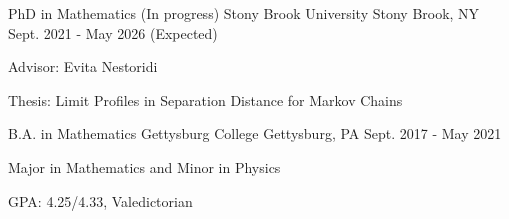 


\begin{cventries}

\cventry
{PhD in Mathematics (In progress)} %
{Stony Brook University} %
{Stony Brook, NY} %
{Sept. 2021 - May 2026 (Expected)} %
{ %
\begin{cvitems}
\item Advisor: Evita Nestoridi
\item Thesis: Limit Profiles in Separation Distance for Markov Chains
\end{cvitems}
}

\cventry
{B.A. in Mathematics} %
{Gettysburg College} %
{Gettysburg, PA} %
{Sept. 2017 - May 2021} %
{ %
\begin{cvitems}
\item Major in Mathematics and Minor in Physics
\item GPA: 4.25/4.33, Valedictorian
\end{cvitems}
}


\end{cventries}
